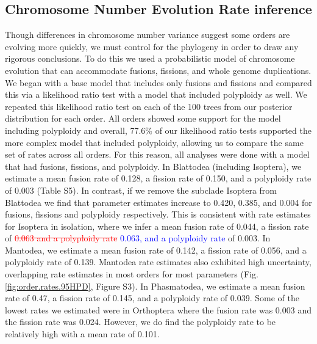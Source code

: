 \documentclass[]{rsos}%
\begin{document}
\subsection{Chromosome Number Evolution Rate inference}
Though differences in chromosome number variance suggest some orders are evolving more quickly, we must control for the phylogeny in order to draw any rigorous conclusions.
To do this we used a probabilistic model of chromosome evolution that can accommodate fusions, fissions, and whole genome duplications.
We began with a base model that includes only fusions and fissions and compared this via a likelihood ratio test with a model that included polyploidy as well.
We repeated this likelihood ratio test on each of the 100 trees from our posterior distribution for each order.
All orders showed some support for the model including polyploidy and overall, 77.6\% of our likelihood ratio tests supported the more complex model that included polyploidy, allowing us to compare the same set of rates across all orders.
For this reason, all analyses were done with a model that had fusions, fissions, and polyploidy.
In Blattodea (including Isoptera), we estimate a mean fusion rate of 0.128, a fission rate of 0.150, and a polyploidy rate of 0.003 (Table S5).
In contrast, if we remove the subclade Isoptera from Blattodea we find that parameter estimates increase to 0.420, 0.385, and 0.004 for fusions, fissions and polyploidy respectively.
This is consistent with rate estimates for Isoptera in isolation, where we infer
a mean fusion rate of 0.044, a fission rate of \textcolor{red}{\st{0.063 and a polyploidy rate}} \textcolor{blue}{0.063, and a polyploidy rate} of 0.003.
In Mantodea, we estimate a mean fusion rate of 0.142, a fission rate of 0.056, and a polyploidy rate of 0.139.
Mantodea rate estimates also exhibited high uncertainty, overlapping rate estimates in most orders for most parameters (Fig. \ref{fig:order.rates.95HPD}, Figure S3).
In Phasmatodea, we estimate a mean fusion rate of 0.47, a fission rate of 0.145, and a polyploidy rate of 0.039.
Some of the lowest rates we estimated were in Orthoptera where the fusion rate was 0.003 and the fission rate was 0.024. However, we do find the polyploidy rate to be relatively high with a mean rate of 0.101.
\end{document}
